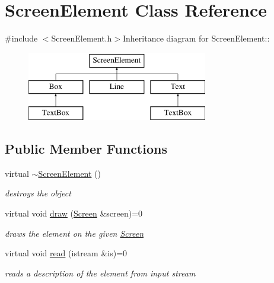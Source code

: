 \hypertarget{classScreenElement}{
\section{ScreenElement Class Reference}
\label{classScreenElement}
}


{\ttfamily \#include $<$ScreenElement.h$>$}Inheritance diagram for ScreenElement::\begin{figure}[H]
\begin{center}
\leavevmode
\includegraphics[height=3cm]{classScreenElement}
\end{center}
\end{figure}
\subsection*{Public Member Functions}
\begin{DoxyCompactItemize}
\item 
\hypertarget{classScreenElement_ae88aa724a30f2aa3b24576a0b8b1ed43}{
virtual \hyperlink{classScreenElement_ae88aa724a30f2aa3b24576a0b8b1ed43}{$\sim$ScreenElement} ()}
\label{classScreenElement_ae88aa724a30f2aa3b24576a0b8b1ed43}

\begin{DoxyCompactList}\small\item\em destroys the object \item\end{DoxyCompactList}\item 
virtual void \hyperlink{classScreenElement_a1bf719edc836cc6ceaa84014c7342028}{draw} (\hyperlink{classScreen}{Screen} \&screen)=0
\begin{DoxyCompactList}\small\item\em draws the element on the given \hyperlink{classScreen}{Screen} \item\end{DoxyCompactList}\item 
virtual void \hyperlink{classScreenElement_ae5c8356d0faace202bb3ee620433677e}{read} (istream \&is)=0
\begin{DoxyCompactList}\small\item\em reads a description of the element from input stream \item\end{DoxyCompactList}\end{DoxyCompactItemize}


